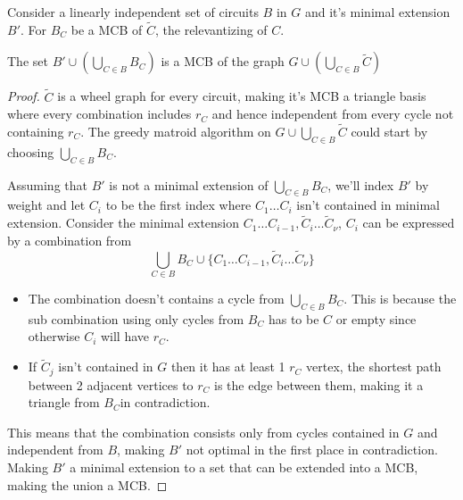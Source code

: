 \begin{theorem}\label{restricting expansion}
        Consider a linearly independent set of circuits $B$ in $G$ and it's minimal extension $B'$. For $B_C$ be a MCB of $\tilde C$, the relevantizing of $C$. 
    
    The set 
    $
    B'\cup \left(\bigcup_{C\in B} B_C\right)
    $
    is a MCB of the graph
    $G\cup \left(\bigcup_{C\in B} \tilde C
    \right)$
\end{theorem}
\begin{proof}
    $\tilde C$ is a wheel graph for every circuit, making it's MCB a triangle basis where every combination includes $r_C$ and hence independent from every cycle not containing $r_C$. 
    The greedy matroid algorithm on $G\cup \bigcup_{C\in B} \tilde C$ could start by choosing $\bigcup_{C\in B} B_C$. 
    
    Assuming that $B'$ is not a minimal extension of $\bigcup_{C\in B} B_C$, we'll index $B'$ by weight and let $C_i$ to be the first index where $C_1\ldots C_i$ isn't contained in minimal extension. Consider the minimal extension $C_1\ldots C_{i-1},\tilde C_i
    \ldots \tilde C_\nu$, $C_i$ can be expressed by a combination from 
    \[
    \bigcup_{C\in B} B_C \cup \{C_1\ldots C_{i-1},\tilde C_i
    \ldots \tilde C_\nu\}
    \]
    \begin{itemize}
        \item The combination doesn't contains a cycle from $\bigcup_{C\in B} B_C$. This is because the sub combination using only cycles from $B_C$ has to be $C$ or empty since otherwise $C_i$ will have $r_C$.
        \item If $\tilde C_j$ isn't contained in $G$ then it has at least 1 $r_C$ vertex, the shortest path between 2 adjacent vertices to $r_C$ is the edge between them, making it a triangle from $B_C$in contradiction.
    \end{itemize}
    This means that the combination consists only from cycles contained in $G$ and independent from $B$, making $B'$ not optimal in the first place in contradiction.
    Making $B'$ a minimal extension to a set that can be extended into a MCB, making the union a MCB.
\end{proof}


